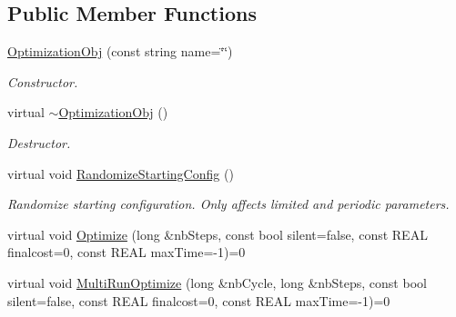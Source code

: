 \subsection*{Public Member Functions}
\begin{DoxyCompactItemize}
\item 
\mbox{\label{class_obj_cryst_1_1_optimization_obj_a939444ac47768e16d205bebbc247cc12}} 
\mbox{\hyperlink{class_obj_cryst_1_1_optimization_obj_a939444ac47768e16d205bebbc247cc12}{Optimization\+Obj}} (const string name=\char`\"{}\char`\"{})
\begin{DoxyCompactList}\small\item\em Constructor. \end{DoxyCompactList}\item 
\mbox{\label{class_obj_cryst_1_1_optimization_obj_ae1d50937a2f3d396144a9fde2c0c5d60}} 
virtual \mbox{\hyperlink{class_obj_cryst_1_1_optimization_obj_ae1d50937a2f3d396144a9fde2c0c5d60}{$\sim$\+Optimization\+Obj}} ()
\begin{DoxyCompactList}\small\item\em Destructor. \end{DoxyCompactList}\item 
\mbox{\label{class_obj_cryst_1_1_optimization_obj_a51b3d3a2ddb01f3499269e7a72581fb4}} 
virtual void \mbox{\hyperlink{class_obj_cryst_1_1_optimization_obj_a51b3d3a2ddb01f3499269e7a72581fb4}{Randomize\+Starting\+Config}} ()
\begin{DoxyCompactList}\small\item\em Randomize starting configuration. Only affects limited and periodic parameters. \end{DoxyCompactList}\item 
virtual void \mbox{\hyperlink{class_obj_cryst_1_1_optimization_obj_a08c77dc6ec80f63bf067ef2968a0b6dc}{Optimize}} (long \&nb\+Steps, const bool silent=false, const R\+E\+AL finalcost=0, const R\+E\+AL max\+Time=-\/1)=0
\item 
virtual void \mbox{\hyperlink{class_obj_cryst_1_1_optimization_obj_aa53575dbda2ec3f561bed934beb4ca6f}{Multi\+Run\+Optimize}} (long \&nb\+Cycle, long \&nb\+Steps, const bool silent=false, const R\+E\+AL finalcost=0, const R\+E\+AL max\+Time=-\/1)=0
\item 
\mbox{\label{class_obj_cryst_1_1_optimization_obj_af8b3cef84c6bcca37cdc4bfde9ecde45}} 

\end{DoxyCompactItemize}
